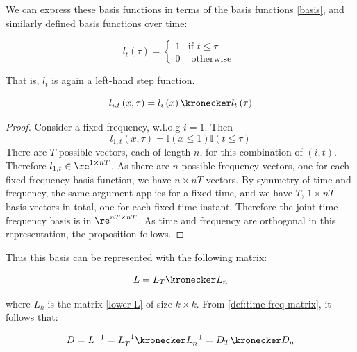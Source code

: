 We can express these basis functions in terms of the basis functions \eqref{basis}, and similarly defined basis functions over time:

\begin{equation}
l_t\left(\tau\right) =
\begin{cases}
1 & \text{if } t \leq \tau \\
0 & \text{ otherwise } 
\end{cases}
\label{time-basis}
\end{equation}

That is, \(l_t\) is again a left-hand step function. 

\begin{proposition}
\begin{equation}
l_{i,t}\left(x, \tau\right) = l_i\left(x\right) \kronecker l_t\left(\tau\right)
\end{equation}
\begin{proof}
Consider a fixed frequency, w.l.o.g \(i=1\). Then 
\begin{equation}
l_{1,t}\left(x, \tau\right) = \mathbb{I}\left(x \leq 1\right)\mathbb{I}\left(t \leq \tau \right)
\end{equation}
There are \(T\) possible vectors, each of length \(n\), for this combination of \(\left(i,t\right)\). Therefore \(l_{1,t}\in \re^{1\times nT} \). As there are \(n\) possible frequency vectors, one for each fixed frequency basis function, we have \(n\times nT\) vectors. By symmetry of time and frequency, the same argument applies for a fixed time, and we have \(T\), \(1\times nT\) basis vectors in total, one for each fixed time instant. Therefore the joint time-frequency basis is in \(\re^{nT \times nT}\). As time and frequency are orthogonal in this representation, the proposition follows.
\end{proof}
\end{proposition}

Thus this basis can be represented with the following matrix:

\begin{equation}
L = L_T \kronecker L_n
\label{def:time-freq matrix}
\end{equation}

where \(L_k\) is the matrix \eqref{lower-L} of size \(k \times k\). From \eqref{def:time-freq matrix}, it follows that:

\begin{equation}
D = L^{-1} = L_T^{-1} \kronecker L_n^{-1} = D_T \kronecker D_n
\end{equation}

